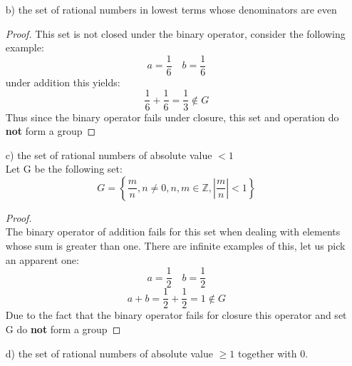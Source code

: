 \documentclass[11pt]{article}
\theoremstyle{definition}  %
\newcommand{\Z}{\mathbb{Z}}
\begin{document}
\begin{enumerate}
\begin{itemize}
\begin{proof}
\begin{enumerate}
\begin{align*}
          &\frac{c_na_mb_n+c_nb_ma_n+c_ma_nb_n}{a_nb_nc_n}=\frac{c_na_mb_n+c_nb_ma_n+c_ma_nb_n}{a_nb_nc_n}\right)
        \end{align*}
        The denominator $a_nb_nc_n$ is the product of three odd numbers which is also odd preserving the construction of G.
        \item Proof of existence of identity element\\
        The Identity element for this set is the element: $\frac{0}{1}=0$
        \item  Proof of existence of inverse of operator\\
        For all g$\in G$ the additive inverse is the element $-g$
      \end{enumerate}
      Thus we have proven that the set G and the operator of addition form a group.
    \end{proof}
    \item[b)] the set of rational numbers in lowest terms whose denominators are even
    \begin{proof}
      This set is not closed under the binary operator, consider the following example:
      \[
        a=\frac{1}{6}\quad b=\frac{1}{6}
      \]
      under addition this yields:
      \[
        \frac{1}{6}+\frac{1}{6}=\frac{1}{3}\notin G
      \] Thus since the binary operator fails under closure, this set and operation do \textbf{not} form a group
    \end{proof}
    \item[c)] the set of rational numbers of absolute value $<1$
    \\
    Let G be the following set:
    \[
      G=\left\{\frac{m}{n},n\neq0,n,m\in \Z, |\frac{m}{n}|<1\right\}
    \]
    \begin{proof}\\
      The binary operator of addition fails for this set when dealing with elements whose sum is greater than one. There are infinite examples of this, let us pick an apparent one:
      \[
        a=\frac{1}{2}\quad b=\frac{1}{2}
      \]
      \[
        a+b=\frac{1}{2}+\frac{1}{2}=1\notin G
      \]
      Due to the fact that the binary operator fails for closure this operator and set G do \textbf{not} form a group
    \end{proof}
     \item[d)] the set of rational numbers of
     absolute value $\geq 1$ together with $0$.

\end{itemize}
\end{enumerate}
\end{document}
